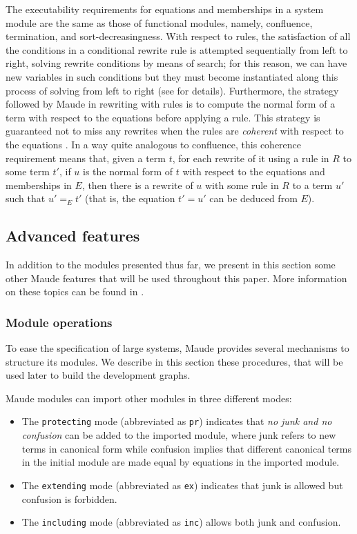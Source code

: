 The executability requirements for equations and memberships in a system
module are the same as those of functional modules, namely, confluence,
termination, and sort-decreasingness. With respect to rules, the satisfaction
of all the conditions in a conditional rewrite rule is attempted sequentially 
from left to right, solving rewrite conditions by means of search; 
for this reason, we can have new variables in such conditions but they
must become instantiated along this process of solving from left to right
(see \cite{maude-book} for details). Furthermore, the strategy followed
by Maude in rewriting with rules is to compute the normal form of a term
with respect to the equations before applying a rule. This strategy is
guaranteed not to miss any rewrites when the rules are \emph{coherent}
with respect to the equations \cite{eq-rl-rwl,maude-book}. In a way
quite analogous to confluence, this coherence requirement means that, given
a term $t$, for each rewrite of it using a rule in $R$ to some term $t'$,
if $u$ is the normal form of $t$ with respect to the equations and
memberships in $E$, then there is a rewrite of $u$ with some rule in
$R$ to a term $u'$ such that $u' =_E t'$ (that is, the equation $t' = u'$
can be deduced from $E$).

\subsection{Advanced features}\label{subsec:adv_feat}

In addition to the modules presented thus far, we present in this section
some other Maude features that will be used throughout this paper. More
information on these topics can be found in \cite{maude-book}.

\subsubsection{Module operations}

To ease the specification of large systems, Maude provides several
mechanisms to structure its modules. We describe in this section these
procedures, that will be used later to build the development graphs.

Maude modules can import other modules in three different modes:
\begin{itemize}
\item
The \verb"protecting" mode (abbreviated as \verb"pr") indicates that \emph{no
junk and no confusion} can be added to the imported module, where junk refers to
new terms in canonical form while confusion implies that different canonical
terms in the initial module are made equal by equations in the imported module.

\item
The \verb"extending" mode (abbreviated as \verb"ex") indicates that junk is
allowed but confusion is forbidden.

\item
The \verb"including" mode (abbreviated as \verb"inc") allows both
junk and confusion.

\end{itemize}

